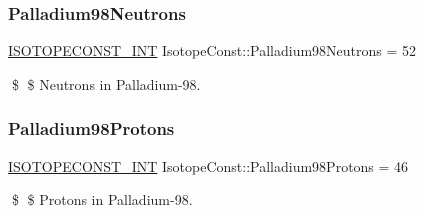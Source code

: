 \subsubsection{\texorpdfstring{Palladium98\+Neutrons}{Palladium98Neutrons}}
{\footnotesize\ttfamily \mbox{\hyperlink{group___isotope_const-_macros_ga5f18360b3e99483a35c32d789e62621c}{I\+S\+O\+T\+O\+P\+E\+C\+O\+N\+S\+T\+\_\+\+I\+NT}} Isotope\+Const\+::\+Palladium98\+Neutrons = 52}

\$ \$ Neutrons in Palladium-\/98. \mbox{\label{group___isotope_const-_palladium-_pd98_gaad335d901e080709e66834155600d7ea}} 
\subsubsection{\texorpdfstring{Palladium98\+Protons}{Palladium98Protons}}
{\footnotesize\ttfamily \mbox{\hyperlink{group___isotope_const-_macros_ga5f18360b3e99483a35c32d789e62621c}{I\+S\+O\+T\+O\+P\+E\+C\+O\+N\+S\+T\+\_\+\+I\+NT}} Isotope\+Const\+::\+Palladium98\+Protons = 46}

\$ \$ Protons in Palladium-\/98. 